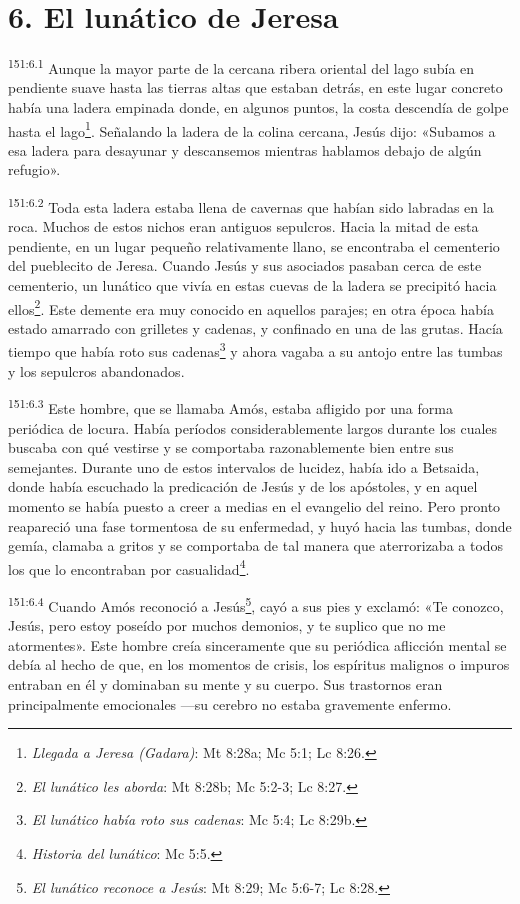 \section*{6. El lunático de Jeresa}
\par 
\textsuperscript{151:6.1} Aunque la mayor parte de la cercana ribera oriental del lago subía en pendiente suave hasta las tierras altas que estaban detrás, en este lugar concreto había una ladera empinada donde, en algunos puntos, la costa descendía de golpe hasta el lago\footnote{\textit{Llegada a Jeresa (Gadara)}: Mt 8:28a; Mc 5:1; Lc 8:26.}. Señalando la ladera de la colina cercana, Jesús dijo: «Subamos a esa ladera para desayunar y descansemos mientras hablamos debajo de algún refugio».

\par 
\textsuperscript{151:6.2} Toda esta ladera estaba llena de cavernas que habían sido labradas en la roca. Muchos de estos nichos eran antiguos sepulcros. Hacia la mitad de esta pendiente, en un lugar pequeño relativamente llano, se encontraba el cementerio del pueblecito de Jeresa. Cuando Jesús y sus asociados pasaban cerca de este cementerio, un lunático que vivía en estas cuevas de la ladera se precipitó hacia ellos\footnote{\textit{El lunático les aborda}: Mt 8:28b; Mc 5:2-3; Lc 8:27.}. Este demente era muy conocido en aquellos parajes; en otra época había estado amarrado con grilletes y cadenas, y confinado en una de las grutas. Hacía tiempo que había roto sus cadenas\footnote{\textit{El lunático había roto sus cadenas}: Mc 5:4; Lc 8:29b.} y ahora vagaba a su antojo entre las tumbas y los sepulcros abandonados.

\par 
\textsuperscript{151:6.3} Este hombre, que se llamaba Amós, estaba afligido por una forma periódica de locura. Había períodos considerablemente largos durante los cuales buscaba con qué vestirse y se comportaba razonablemente bien entre sus semejantes. Durante uno de estos intervalos de lucidez, había ido a Betsaida, donde había escuchado la predicación de Jesús y de los apóstoles, y en aquel momento se había puesto a creer a medias en el evangelio del reino. Pero pronto reapareció una fase tormentosa de su enfermedad, y huyó hacia las tumbas, donde gemía, clamaba a gritos y se comportaba de tal manera que aterrorizaba a todos los que lo encontraban por casualidad\footnote{\textit{Historia del lunático}: Mc 5:5.}.

\par 
\textsuperscript{151:6.4} Cuando Amós reconoció a Jesús\footnote{\textit{El lunático reconoce a Jesús}: Mt 8:29; Mc 5:6-7; Lc 8:28.}, cayó a sus pies y exclamó: «Te conozco, Jesús, pero estoy poseído por muchos demonios, y te suplico que no me atormentes». Este hombre creía sinceramente que su periódica aflicción mental se debía al hecho de que, en los momentos de crisis, los espíritus malignos o impuros entraban en él y dominaban su mente y su cuerpo. Sus trastornos eran principalmente emocionales ---su cerebro no estaba gravemente enfermo.

